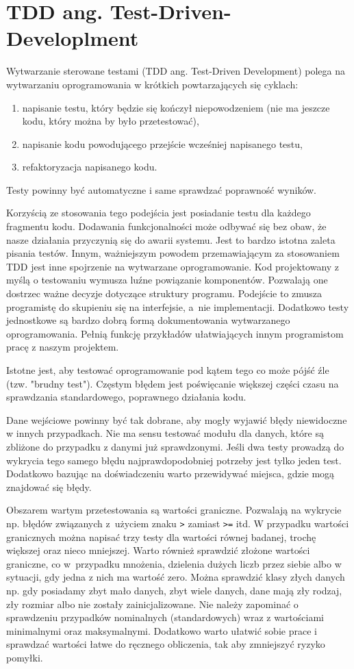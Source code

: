 \section{TDD ang. Test-Driven-Developlment}

Wytwarzanie sterowane testami (TDD ang. Test-Driven Development) polega na wytwarzaniu oprogramowania w krótkich powtarzających się cyklach:
\begin{enumerate}
	\item napisanie testu, który będzie się kończył niepowodzeniem (nie ma jeszcze kodu, który można by było przetestować),
	\item napisanie kodu powodującego przejście wcześniej napisanego testu,
	\item refaktoryzacja napisanego kodu.
\end{enumerate}
Testy powinny być automatyczne i same sprawdzać poprawność wyników.

Korzyścią ze stosowania tego podejścia jest posiadanie testu dla każdego fragmentu kodu. Dodawania funkcjonalności może odbywać się bez obaw, że nasze działania przyczynią się do awarii systemu. Jest to bardzo istotna zaleta pisania testów. Innym, ważniejszym powodem przemawiającym za stosowaniem TDD jest inne spojrzenie na wytwarzane oprogramowanie. Kod projektowany z myślą o testowaniu wymusza luźne powiązanie komponentów. Pozwalają one dostrzec ważne decyzje dotyczące struktury programu. Podejście to zmusza programistę do skupieniu się na interfejsie, a~nie implementacji. Dodatkowo testy jednostkowe są bardzo dobrą formą dokumentowania wytwarzanego oprogramowania. Pełnią funkcję przykładów ułatwiających innym programistom pracę z naszym projektem. 

Istotne jest, aby testować oprogramowanie pod kątem tego co może pójść źle (tzw. "brudny test"). Częstym błędem jest poświęcanie większej części czasu na sprawdzania standardowego, poprawnego działania kodu. 

Dane wejściowe powinny być tak dobrane, aby mogły wyjawić błędy niewidoczne w innych przypadkach. Nie ma sensu testować modułu dla danych, które są zbliżone do przypadku z danymi już sprawdzonymi. Jeśli dwa testy prowadzą do wykrycia tego samego błędu najprawdopodobniej potrzeby jest tylko jeden test. Dodatkowo bazując na doświadczeniu warto przewidywać miejsca, gdzie mogą znajdować się błędy. 

Obszarem wartym przetestowania są wartości graniczne. Pozwalają na wykrycie np. błędów związanych z~użyciem znaku \texttt{>} zamiast \texttt{>=} itd. W przypadku wartości granicznych można napisać trzy testy dla wartości równej badanej, trochę większej oraz nieco mniejszej. Warto również sprawdzić złożone wartości graniczne, co w~przypadku mnożenia, dzielenia dużych liczb przez siebie albo w sytuacji, gdy jedna z nich ma wartość zero. Można sprawdzić klasy złych danych np. gdy posiadamy zbyt mało danych, zbyt wiele danych, dane mają zły rodzaj, zły rozmiar albo nie zostały zainicjalizowane. Nie należy zapominać o sprawdzeniu przypadków nominalnych (standardowych) wraz z wartościami minimalnymi oraz maksymalnymi. Dodatkowo warto ułatwić sobie prace i sprawdzać wartości łatwe do ręcznego obliczenia, tak aby zmniejszyć ryzyko pomyłki. 

